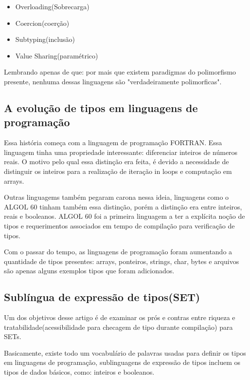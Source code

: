 \documentclass[12pt]{article}
\begin{document}
        \begin{itemize}
            \item Overloading(Sobrecarga)
            \item Coercion(coerção)
            \item Subtyping(inclusão)
            \item Value Sharing(paramétrico)
        \end{itemize}

        Lembrando apenas de que: por mais que existem paradigmas do polimorfismo presente, 
        nenhuma dessas linguagens são "verdadeiramente polimorficas".

        \subsection{A evolução de tipos em linguagens de programação}

        Essa história começa com a linguagem de programação FORTRAN. Essa linguagem tinha 
        uma propriedade interessante: diferenciar inteiros de números reais. O motivo pelo 
        qual essa distinção era feita, é devido a necessidade de distinguir os inteiros para 
        a realização de iteração in loops e computação em arrays.

        Outras linguagems também pegaram carona nessa ideia, linguagens como o ALGOL 60 
        tinham também essa distinção, porém a distinção era entre inteiros, reais e booleanos.
        ALGOL 60  foi a primeira linguagem a ter a explícita noção de tipos e requerimentos
        associados em tempo de compilação para verificação de tipos.

        Com o passar do tempo, as linguagens de programação foram aumentando a 
        quantidade de tipos presentes: arrays, ponteiros, strings, char, bytes e arquivos
        são apenas alguns exemplos tipos que foram adicionados.

        \subsection{Sublíngua de expressão de tipos(SET)}

        Um dos objetivos desse artigo é de examinar os prós e contras entre 
        riqueza e tratabilidade(acessibilidade para checagem de tipo durante compilação)
        para SETs.
        
        Basicamente, existe todo um vocabulário de palavras usadas para definir os tipos 
        em linguagens de programação, sublinguagens de expressão de tipos incluem os tipos de 
        dados básicos, como: inteiros e booleanos.
\end{document}
